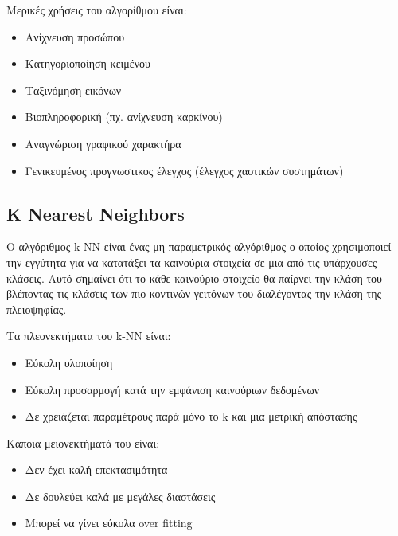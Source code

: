 Μερικές χρήσεις του αλγορίθμου είναι\cite{svmuse}:
\begin{itemize}
    \item Ανίχνευση προσώπου
    \item Κατηγοριοποίηση κειμένου
    \item Ταξινόμηση εικόνων
    \item Βιοπληροφορική (πχ. ανίχνευση καρκίνου)
    \item Αναγνώριση γραφικού χαρακτήρα
    \item Γενικευμένος προγνωστικος έλεγχος (έλεγχος χαοτικών συστημάτων)
\end{itemize}

\subsection{\textlatin{K Nearest Neighbors}}
Ο αλγόριθμος \textlatin{k-NN} είναι ένας μη παραμετρικός αλγόριθμος ο οποίος χρησιμοποιεί την
εγγύτητα για να κατατάξει τα καινούρια στοιχεία σε μια από τις υπάρχουσες κλάσεις\cite{knnintro}. Αυτό
σημαίνει ότι το κάθε καινούριο στοιχείο θα παίρνει την κλάση του βλέποντας τις κλάσεις των πιο
κοντινών γειτόνων του διαλέγοντας την κλάση της πλειοψηφίας.

Τα πλεονεκτήματα του \textlatin{k-NN} είναι:
\begin{itemize}
    \item Εύκολη υλοποίηση
    \item Εύκολη προσαρμογή κατά την εμφάνιση καινούριων δεδομένων
    \item Δε χρειάζεται παραμέτρους παρά μόνο το \textlatin{k} και μια μετρική απόστασης
\end{itemize}

Κάποια μειονεκτήματά του είναι:
\begin{itemize}
    \item Δεν έχει καλή επεκτασιμότητα
    \item Δε δουλεύει καλά με μεγάλες διαστάσεις
    \item Μπορεί να γίνει εύκολα \textlatin{over fitting}
\end{itemize}

